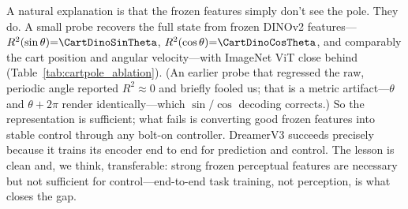 \documentclass[11pt]{article}
\begin{document}
A natural explanation is that the frozen features simply don't see the pole. They do. A
small probe recovers the full state from frozen DINOv2 features---$R^2(\sin\theta)
{=}\CartDinoSinTheta$, $R^2(\cos\theta){=}\CartDinoCosTheta$, and comparably the cart
position and angular velocity---with ImageNet ViT close behind (Table~\ref{tab:cartpole_ablation}).
(An earlier probe that regressed the raw, periodic angle reported $R^2{\approx}0$
and briefly fooled us; that is a metric artifact---$\theta$ and $\theta{+}2\pi$ render
identically---which $\sin/\cos$ decoding corrects.) So the representation is sufficient;
what fails is converting good frozen features into stable control through any
bolt-on controller. DreamerV3 succeeds precisely because it trains its encoder end to end
for prediction and control. The lesson is clean and, we think, transferable: strong
frozen perceptual features are necessary but not sufficient for control---end-to-end task
training, not perception, is what closes the gap.

\begin{table}[htb]\centering\small

\caption{\textbf{Frozen-encoder probe (E67).} Frozen visual encoders decode the full
cartpole state (high $R^2$ on $\sin\theta,\cos\theta,x,\dot\theta$), yet behavioral
cloning of the verified expert on those features solves $0\%$---the bottleneck is control,
not perception.}
\label{tab:cartpole_ablation}
\end{table}
\end{document}
